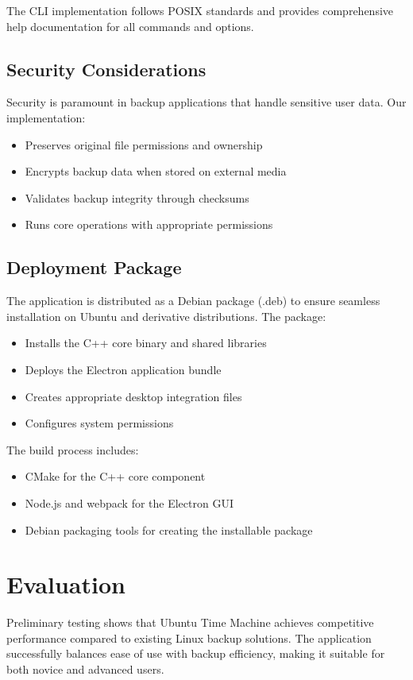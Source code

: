 \documentclass[journal,twoside,10pt]{IEEEtran}
\begin{document}
The CLI implementation follows POSIX standards and provides comprehensive help documentation for all commands and options.

\subsection{Security Considerations}
Security is paramount in backup applications that handle sensitive user data. Our implementation:
\begin{itemize}
    \item Preserves original file permissions and ownership
    \item Encrypts backup data when stored on external media
    \item Validates backup integrity through checksums
    \item Runs core operations with appropriate permissions
\end{itemize}

\subsection{Deployment Package}
The application is distributed as a Debian package (.deb) to ensure seamless installation on Ubuntu and derivative distributions. The package:
\begin{itemize}
    \item Installs the C++ core binary and shared libraries
    \item Deploys the Electron application bundle
    \item Creates appropriate desktop integration files
    \item Configures system permissions
\end{itemize}

The build process includes:
\begin{itemize}
    \item CMake for the C++ core component
    \item Node.js and webpack for the Electron GUI
    \item Debian packaging tools for creating the installable package
\end{itemize}

\section{Evaluation}
Preliminary testing shows that Ubuntu Time Machine achieves competitive performance compared to existing Linux backup solutions. The application successfully balances ease of use with backup efficiency, making it suitable for both novice and advanced users.
\end{document}
